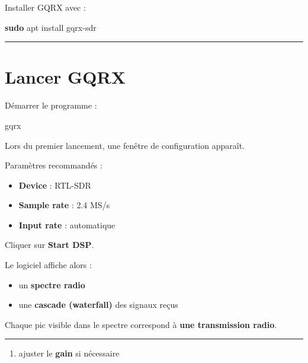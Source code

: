 \documentclass[
  french,
]{article}
\newenvironment{Shaded}{\begin{snugshade}}{\end{snugshade}}
\newcommand{\ExtensionTok}[1]{#1}
\newcommand{\FunctionTok}[1]{\textcolor[rgb]{0.13,0.29,0.53}{\textbf{#1}}}
\newcommand{\NormalTok}[1]{#1}
\providecommand{\tightlist}{%
  \setlength{\itemsep}{0pt}\setlength{\parskip}{0pt}}
\begin{document}
Installer GQRX avec :

\begin{Shaded}
\begin{Highlighting}[]
\FunctionTok{sudo}\NormalTok{ apt install gqrx{-}sdr}
\end{Highlighting}
\end{Shaded}

\begin{center}\rule{0.5\linewidth}{0.5pt}\end{center}

\section{Lancer GQRX}\label{lancer-gqrx}

Démarrer le programme :

\begin{Shaded}
\begin{Highlighting}[]
\ExtensionTok{gqrx}
\end{Highlighting}
\end{Shaded}

Lors du premier lancement, une fenêtre de configuration apparaît.

Paramètres recommandés :

\begin{itemize}
\tightlist
\item
  \textbf{Device} : RTL-SDR
\item
  \textbf{Sample rate} : 2.4 MS/s
\item
  \textbf{Input rate} : automatique
\end{itemize}

Cliquer sur \textbf{Start DSP}.

Le logiciel affiche alors :

\begin{itemize}
\tightlist
\item
  un \textbf{spectre radio}
\item
  une \textbf{cascade (waterfall)} des signaux reçus
\end{itemize}

Chaque pic visible dans le spectre correspond à \textbf{une transmission
radio}.

\begin{center}\rule{0.5\linewidth}{0.5pt}\end{center}

\begin{enumerate}
\def\labelenumi{\arabic{enumi}.}
\setcounter{enumi}{2}
\tightlist
\item
  ajuster le \textbf{gain} si nécessaire
\end{enumerate}
\end{document}
